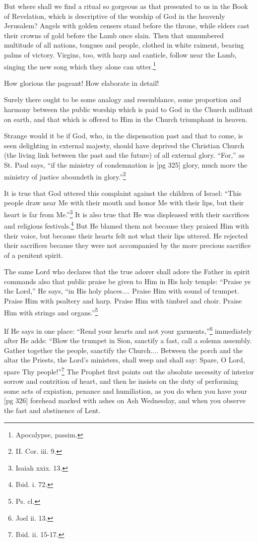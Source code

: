 But where shall we find a ritual so gorgeous as
that presented to us in the Book of Revelation,
which is descriptive of the worship of God in the
heavenly Jerusalem? Angels with golden censers
stand before the throne, while elders cast their
crowns of gold before the Lamb once slain. Then
that unnumbered multitude of all nations, tongues
and people, clothed in white raiment, bearing palms
of victory. Virgins, too, with harp and canticle,
follow near the Lamb, singing the new song which
they alone can utter.\footnote{Apocalypse, passim.}

How glorious the pageant! How elaborate in
detail!

Surely there ought to be some analogy and resemblance,
some proportion and harmony between
the public worship which is paid to God in the
Church militant on earth, and that which is offered
to Him in the Church triumphant in heaven.

Strange would it be if God, who, in the dispensation
past and that to come, is seen delighting in
external majesty, should have deprived the Christian
Church (the living link between the past and
the future) of all external glory. “For,” as St.
Paul says, “if the ministry of condemnation is
[pg 325]
glory, much more the ministry of justice aboundeth
in glory.”\footnote{II. Cor. iii. 9.}

It is true that God uttered this complaint against
the children of Israel: “This people draw near Me
with their mouth and honor Me with their lips,
but their heart is far from Me.”\footnote{Isaiah
xxix. 13.} It is also true
that He was displeased with their sacrifices and
religious festivals.\footnote{Ibid. i.
72.} But He blamed them not because
they praised Him with their voice, but because
their hearts felt not what their lips uttered.
He rejected their sacrifices because they were not
accompanied by the more precious sacrifice of a
penitent spirit.

The same Lord who declares that the true adorer
shall adore the Father in spirit commands also that
public praise be given to Him in His holy temple:
“Praise ye the Lord,” He says, “in His holy
places.... Praise Him with sound of trumpet.
Praise Him with psaltery and harp. Praise Him
with timbrel and choir. Praise Him with strings
and organs.”\footnote{Ps. cl.}

If He says in one place: “Rend your hearts and
not your garments,”\footnote{Joel ii.
13.} immediately after He adds:
“Blow the trumpet in Sion, sanctify a fast, call a
solemn assembly. Gather together the people,
sanctify the Church.... Between the porch and
the altar the Priests, the Lord's ministers, shall
weep and shall say: Spare, O Lord, spare Thy
people!”\footnote{Ibid. ii.
15-17.} The Prophet first points out the absolute
necessity of interior sorrow and contrition
of heart, and then he insists on the duty of
performing some acts of expiation, penance
and humiliation, as you do when you have your
[pg 326]
forehead marked with ashes on Ash Wednesday,
and when you observe the fast and abstinence of
Lent.

